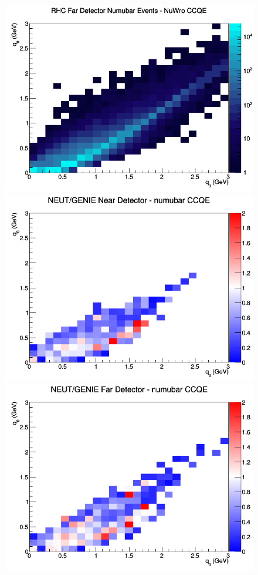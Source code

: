 \begin{figure}[h]
\endminipage
{}
\includegraphics[width=\linewidth]{eff_q0_q3/GAr/CCQE_RHC_FD_numubar_q3_q0_NuWro.png}
\endminipage
\newline
{}
\includegraphics[width=\linewidth]{eff_q0_q3/GAr/ratios/CCQE_NEUT_GENIE_numubar_near_q3_q0.png}
\endminipage
{}
\includegraphics[width=\linewidth]{eff_q0_q3/GAr/ratios/CCQE_NEUT_GENIE_numubar_far_q3_q0.png}

\end{figure}
